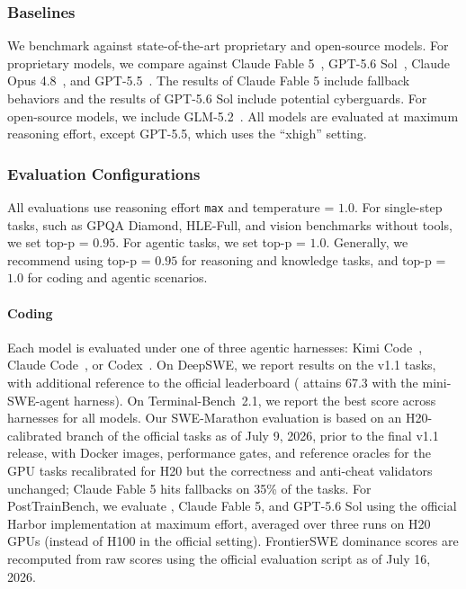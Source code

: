 

\subsubsection{Baselines}
We benchmark against state-of-the-art proprietary and open-source models. For proprietary models, we compare against Claude Fable 5~\citep{claudefable5}, GPT-5.6 Sol~\citep{gpt56sol}, Claude Opus 4.8~\citep{claudeopus48}, and GPT-5.5~\citep{gpt55}. The results of Claude Fable 5 include fallback behaviors and the results of GPT-5.6 Sol include potential cyberguards. For open-source models, we include GLM-5.2~\citep{glm5zhipu}. All models are evaluated at maximum reasoning effort, except GPT-5.5, which uses the ``xhigh'' setting.

\subsubsection{Evaluation Configurations}
All  evaluations use reasoning effort \texttt{max} and temperature = $1.0$. For single-step tasks, such as GPQA Diamond, HLE-Full, and vision benchmarks without tools, we set top-p = $0.95$. For agentic tasks, we set top-p = $1.0$. Generally, we recommend using top-p = $0.95$ for reasoning and knowledge tasks, and top-p = $1.0$ for coding and agentic scenarios.


\paragraph{Coding} Each model is evaluated under one of three agentic harnesses: Kimi Code~\citep{kimicode}, Claude Code~\citep{claudecode}, or Codex~\citep{openaicodex}. On DeepSWE, we report results on the v1.1 tasks, with additional reference to the official leaderboard ( attains 67.3 with the mini-SWE-agent harness). On Terminal-Bench~2.1, we report the best score across harnesses for all models. Our SWE-Marathon evaluation is based on an H20-calibrated branch of the official tasks as of July 9, 2026, prior to the final v1.1 release, with Docker images, performance gates, and reference oracles for the GPU tasks recalibrated for H20 but the correctness and anti-cheat validators unchanged; Claude Fable 5 hits fallbacks on 35\% of the tasks. For PostTrainBench, we evaluate , Claude Fable 5, and GPT-5.6 Sol using the official Harbor implementation at maximum effort, averaged over three runs on H20 GPUs (instead of H100 in the official setting). FrontierSWE dominance scores are recomputed from raw scores using the official evaluation script as of July 16, 2026.

